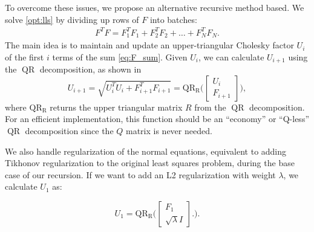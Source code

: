 \documentclass[../root.tex]{subfiles}
\begin{document}
To overcome these issues, we propose an alternative recursive method based. We solve
\eqref{opt:lls} by dividing up rows of $F$ into batches:
\begin{align} \label{eq:F_sum}
  F^T F = F_1^T F_1 + F_2^T F_2 + \ldots + F_N^T F_N.
\end{align}
The main idea is to maintain and update an upper-triangular Cholesky factor $U_i$ of the
first $i$ terms of the sum \eqref{eq:F_sum}. Given $U_i$, we can calculate $U_{i+1}$ using
the $\operatorname{QR}$ decomposition, as shown in \cite{howell_ALTRO_2019}
\begin{equation}
  U_{i+1} = \sqrt{U_i^TU_i + F_{i+1}^TF_{i+1}} = 
  \operatorname{QR_R}\bigg( \begin{bmatrix} {U_i} \\ {F_{i+1}} \end{bmatrix} \bigg),
\end{equation}
where $\operatorname{QR_R}$ returns the upper triangular matrix $R$ from the 
$\operatorname{QR}$ decomposition. For an efficient implementation, this function should be
an ``economy'' or ``Q-less'' $\operatorname{QR}$ decomposition 
since the $Q$ matrix is never needed.

We also handle regularization of the normal equations, equivalent to adding Tikhonov
regularization to the original least squares problem, during the base
case of our recursion. If we want to add an L2 regularization with weight $\lambda$, we
calculate $U_1$ as:

\begin{equation}
  U_1 =  \operatorname{QR_R}\bigg( 
  \begin{bmatrix} {F_1} \\ \sqrt{\lambda} I \end{bmatrix}.
  \bigg).
\end{equation}

\end{document}
